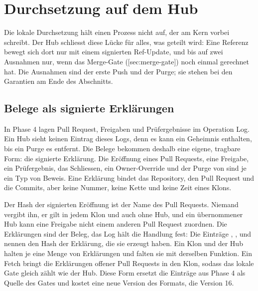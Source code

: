 \section[sec:hub-enforcement]{Durchsetzung auf dem Hub}

Die lokale Durchsetzung hält einen Prozess nicht auf, der am Kern vorbei schreibt.
Der Hub schliesst diese Lücke für alles, was geteilt wird: Eine Referenz bewegt sich dort nur
mit einem signierten Ref-Update, und  bis auf zwei Ausnahmen nur, wenn das
Merge-Gate ([sec:merge-gate]) noch einmal gerechnet hat.
Die Ausnahmen sind der erste Push und der Purge; sie stehen bei den Garantien am Ende des
Abschnitts.

\subsection{Belege als signierte Erklärungen}

In Phase 4 lagen Pull Request, Freigaben und Prüfergebnisse im Operation Log.
Ein Hub sieht keinen Eintrag dieses Logs, denn es kann ein Geheimnis enthalten, bis ein Purge es
entfernt.
Die Belege bekommen deshalb eine eigene, tragbare Form: die signierte Erklärung.
Die Eröffnung eines Pull Requests, eine Freigabe, ein Prüfergebnis, das Schliessen, ein
Owner-Override und der Purge von  sind je ein Typ von Beweis.
Eine Erklärung bindet das Repository, den Pull Request und die Commits, aber keine Nummer, keine
Kette und keine Zeit eines Klons.

Der Hash der signierten Eröffnung ist der Name des Pull Requests.
Niemand vergibt ihn, er gilt in jedem Klon und auch ohne Hub, und ein übernommener Hub kann eine
Freigabe nicht einem anderen Pull Request zuordnen.
Die Erklärungen sind der Beleg, das Log hält die Handlung fest: Die Einträge ,
,  und  nennen den Hash der Erklärung, die sie
erzeugt haben.
Ein Klon und der Hub halten je eine Menge von Erklärungen und falten sie mit derselben Funktion.
Ein Fetch bringt die Erklärungen offener Pull Requests in den Klon, sodass das lokale Gate gleich
zählt wie der Hub.
Diese Form ersetzt die Einträge aus Phase 4 als Quelle des Gates und kostet eine neue Version des
Formats, die Version 16.

